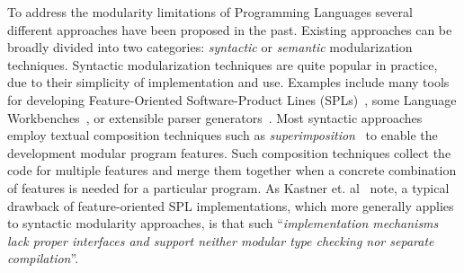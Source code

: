 \begin{comment}
Most programming languages share alot of features in
common. 

For example, most languages have language constructs for:
binding (such as variables, functions, and function applications);
basic arithmetic operations; basic logic and conditional operations;
loops; as well as various other features. For each language construct,
various operations (such as evaluation, compilation, or parsing) need
to be implemented. It is reasonable to wonder whether we can simply
implement those features independently of a particular implementation
of a programming language. Evaluation could be defined independently 
for binding and arithmetic constructs. If the language to be
implemented is the pure lambda calculus, only evaluation of binding 
constructs is necessary. Thus only the component that implements 
evaluation for binding needs to be used in such an implementation.
However, more realistic programming languages 
will include arithmetic constructs, and will require an evaluation
function for those. 


Then it would be possible to \emph{reuse}
some of those features in \emph{multiple} different implementations of
programming languages. Essentially, this would enable a SPL for
programming languages, where all

A solution to the Expression Problem could ena



A concrete 
example that illustrates this issue is 
\end{comment}

To address the modularity limitations of Programming Languages several
different approaches have been proposed in the past. Existing
approaches can be broadly divided into two categories:
\emph{syntactic} or \emph{semantic} modularization
techniques. Syntactic modularization techniques are quite popular in
practice, due to their simplicity of implementation and use. 
Examples include many tools for developing Feature-Oriented Software-Product
Lines (SPLs)~\cite{Kastner11road}, some Language Workbenches~\cite{}, or extensible parser
generators~\cite{}.  Most syntactic approaches employ textual
composition techniques such as \emph{superimposition}~\cite{} to
enable the development modular program features. Such 
composition techniques collect the code for multiple features and
merge them together when a concrete combination of features is needed
for a particular program. As Kastner et. al~\cite{Kastner11road} note, 
a typical drawback of feature-oriented SPL implementations, which 
more generally applies to syntactic modularity approaches, is that
such ``\emph{implementation mechanisms lack proper
  interfaces and support neither modular type checking nor separate
  compilation}''. 

